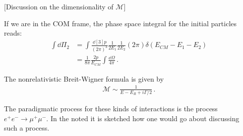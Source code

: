\documentclass[main.tex]{subfiles}
\begin{document}
[Discussion on the dimensionality of \(\mathcal{M}\)]

If we are in the COM frame, the phase space integral for the initial particles reads: 
%
\begin{align}
\int \dd{\Pi_{2}} &= \int \frac{\dd[3]{p}}{(2 \pi )^3} \frac{1}{2 E_1 } \frac{1}{2 E_2 } (2 \pi ) \delta (E_{CM} - E_1 - E_2 )   \\
&= \frac{1}{8 \pi } \frac{2p}{E_{CM}} \int  \frac{\dd{\Omega}}{4 \pi } 
\,.
\end{align}

The nonrelativistic Breit-Wigner formula is given by 
%
\begin{align}
\mathcal{M} \sim \frac{1}{E - E_R + i \Gamma/ 2}  
\,.
\end{align}

The paradigmatic process for these kinds of interactions is the process \(e^{+}e^{-} \to \mu^{+}\mu^- \). 
In the noted it is sketched how one would go about discussing such a process. 
\end{document}
